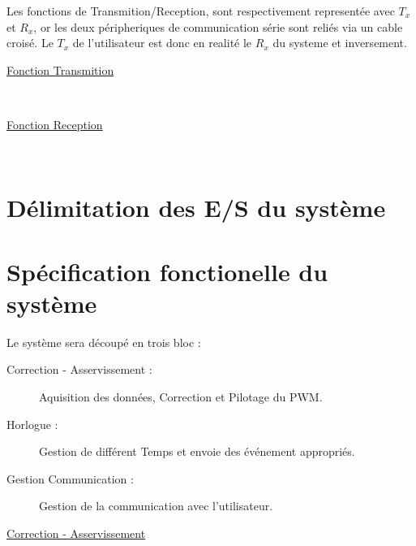 \documentclass[11pt, french]{article} %
\begin{document}
\newpage

Les fonctions de Transmition/Reception, sont respectivement representée avec $T_x$ et $R_x$, or les deux péripheriques de communication série sont reliés via un cable croisé. Le $T_x$ de l'utilisateur est donc en realité le $R_x$ du systeme et inversement.

\begin{minipage}[t, h]{5cm}
\hspace{0.2in}
\underline{Fonction Transmition}
\end{minipage}
~
\begin{minipage}[t, h]{9cm}

\end{minipage}

\begin{minipage}[t, h]{5cm}
\hspace{0.2in}
\underline{Fonction Reception}
\end{minipage}
~
\begin{minipage}[t, h]{9cm}

\end{minipage}

\section{Délimitation des E/S du système}



\section{Spécification fonctionelle du système}

Le système sera découpé en trois bloc :
\vspace{0.1in}
\begin{description}
\item[Correction - Asservissement : ] Aquisition des données, Correction et Pilotage du PWM.
\item[Horlogue : ] Gestion de différent Temps et envoie des événement appropriés.
\item[Gestion Communication : ] Gestion de la communication avec l'utilisateur.
\end{description}

\vspace{0.2in}
\underline{Correction - Asservissement}

\begin{center}

\end{center}
\end{document}
